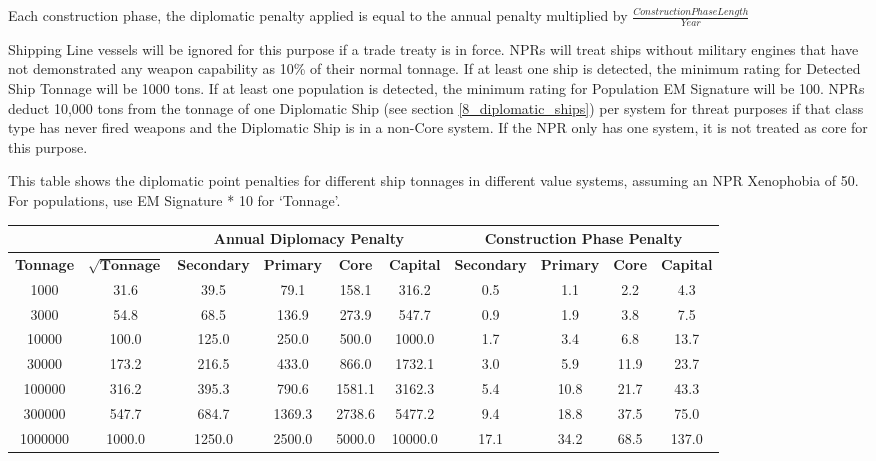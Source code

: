 \documentclass[../Aurora C# unofficial manual.tex]{subfiles}
\begin{document}
	Each construction phase, the diplomatic penalty applied is equal to the annual penalty multiplied by \( \frac{Construction Phase Length}{Year} \)
	
	Shipping Line vessels will be ignored for this purpose if a trade treaty is in force. NPRs will treat ships without military engines that have not demonstrated any weapon capability as 10\% of their normal tonnage. If at least one ship is detected, the minimum rating for Detected Ship Tonnage will be 1000 tons. If at least one population is detected, the minimum rating for Population EM Signature will be 100. NPRs deduct 10,000 tons from the tonnage of one Diplomatic Ship (see section \ref{8_diplomatic_ships}) per system for threat purposes if that class type has never fired weapons and the Diplomatic Ship is in a non-Core system. If the NPR only has one system, it is not treated as core for this purpose.
	
	This table shows the diplomatic point penalties for different ship tonnages in different value systems, assuming an NPR Xenophobia of 50. For populations, use EM Signature * 10 for ‘Tonnage’.
	\begin{center}
		\begin{tabular}{|c|c|c|c|c|c|c|c|c|c|}
			\hline
			\multicolumn{2}{|c}{}  & \multicolumn{4}{|c|}{\textbf{Annual Diplomacy Penalty}} & \multicolumn{4}{c|}{\textbf{Construction Phase Penalty}}  \\
			\hline
			\textbf{Tonnage} & \( \sqrt{\textbf{Tonnage}} \) & \textbf{Secondary} & \textbf{Primary} & \textbf{Core} & \textbf{Capital} & \textbf{Secondary} & \textbf{Primary} & \textbf{Core} & \textbf{Capital} \\
			\hline
			1000 & 31.6 & 39.5 & 79.1 & 158.1 & 316.2 & 0.5 & 1.1 & 2.2 & 4.3 \\
			\hline
			3000 & 54.8 & 68.5 & 136.9 & 273.9 & 547.7 & 0.9 & 1.9 & 3.8 & 7.5 \\
			\hline
			10000 & 100.0 & 125.0 & 250.0 & 500.0 & 1000.0 & 1.7 & 3.4 & 6.8 & 13.7 \\
			\hline
			30000 & 173.2 & 216.5 & 433.0 & 866.0 & 1732.1 & 3.0 & 5.9 & 11.9 & 23.7 \\
			\hline
			100000 & 316.2 & 395.3 & 790.6 & 1581.1 & 3162.3 & 5.4 & 10.8 & 21.7 & 43.3 \\
			\hline
			300000 & 547.7 & 684.7 & 1369.3 & 2738.6 & 5477.2 & 9.4 & 18.8 & 37.5 & 75.0 \\
			\hline
			1000000 & 1000.0 & 1250.0 & 2500.0 & 5000.0 & 10000.0 & 17.1 & 34.2 & 68.5 & 137.0 \\
			\hline
		\end{tabular}
	\end{center}
	
\end{document}
